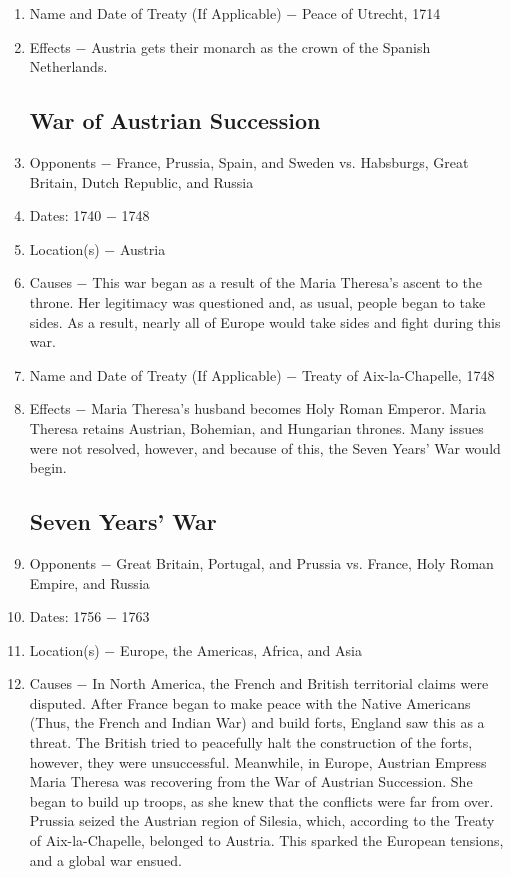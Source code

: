\documentclass[12pt]{article}
\begin{document}
\begin{enumerate}
\item Name and Date of Treaty (If Applicable) $-$ Peace of Utrecht, 1714

\item Effects $-$ Austria gets their monarch as the crown of the Spanish Netherlands. 

\subsection{War of Austrian Succession}

\item Opponents $-$ France, Prussia, Spain, and Sweden vs. Habsburgs, Great Britain, Dutch Republic, and Russia

\item Dates: 1740 $-$ 1748

\item Location(s) $-$ Austria

\item Causes $-$ This war began as a result of the Maria Theresa's ascent to the throne. Her legitimacy was questioned and, as usual, people began to take sides.  As a result, nearly all of Europe would take sides and fight during this war.

\item Name and Date of Treaty (If Applicable) $-$ Treaty of Aix-la-Chapelle, 1748

\item Effects $-$ Maria Theresa's husband becomes Holy Roman Emperor. Maria Theresa retains Austrian, Bohemian, and Hungarian thrones. Many issues were not resolved, however, and because of this, the Seven Years' War would begin.

\subsection{Seven Years' War}

\item Opponents $-$ Great Britain, Portugal, and Prussia vs. France, Holy Roman Empire, and Russia

\item Dates: 1756 $-$ 1763

\item Location(s) $-$ Europe, the Americas, Africa, and Asia 

\item Causes $-$ In North America, the French and British territorial claims were disputed. After France began to make peace with the Native Americans (Thus, the French and Indian War) and build forts, England saw this as a threat. The British tried to peacefully halt the construction of the forts, however, they were unsuccessful. Meanwhile, in Europe, Austrian Empress Maria Theresa was recovering from the War of Austrian Succession. She began to build up troops, as she knew that the conflicts were far from over. Prussia seized the Austrian region of Silesia, which, according to the Treaty of Aix-la-Chapelle, belonged to Austria. This sparked the European tensions, and a global war ensued. 


\end{enumerate}
\end{document}
